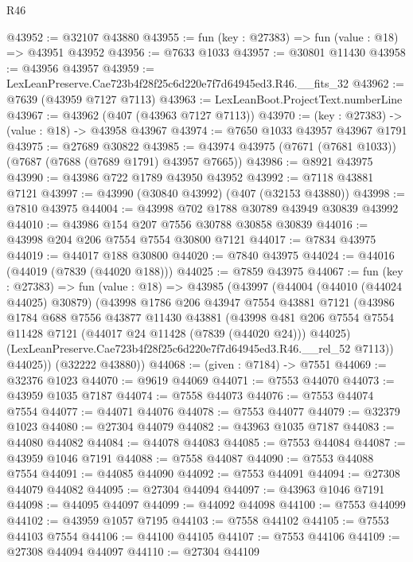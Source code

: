 \begin{lexlean}{R46}
\begin{coremodule}
@43952 := @32107 @43880
@43955 := fun (key : @27383) => fun (value : @18) => @43951 @43952
@43956 := @7633 @1033
@43957 := @30801 @11430
@43958 := @43956 @43957
@43959 := LexLeanPreserve.Cae723b4f28f25c6d220e7f7d64945ed3.R46.__fits_32
@43962 := @7639 (@43959 @7127 @7113)
@43963 := LexLeanBoot.ProjectText.numberLine
@43967 := @43962 (@407 (@43963 @7127 @7113))
@43970 := (key : @27383) -> (value : @18) -> @43958 @43967
@43974 := @7650 @1033 @43957 @43967 @1791
@43975 := @27689 @30822
@43985 := @43974 @43975 (@7671 (@7681 @1033)) (@7687 (@7688 (@7689 @1791) @43957 @7665))
@43986 := @8921 @43975
@43990 := @43986 @722 @1789 @43950 @43952
@43992 := @7118 @43881 @7121
@43997 := @43990 (@30840 @43992) (@407 (@32153 @43880))
@43998 := @7810 @43975
@44004 := @43998 @702 @1788 @30789 @43949 @30839 @43992
@44010 := @43986 @154 @207 @7556 @30788 @30858 @30839
@44016 := @43998 @204 @206 @7554 @7554 @30800 @7121
@44017 := @7834 @43975
@44019 := @44017 @188 @30800
@44020 := @7840 @43975
@44024 := @44016 (@44019 (@7839 (@44020 @188)))
@44025 := @7859 @43975
@44067 := fun (key : @27383) =>
  fun (value : @18) =>
  @43985
    (@43997
      (@44004
        (@44010 (@44024 @44025) @30879)
        (@43998
          @1786
          @206
          @43947
          @7554
          @43881
          @7121
          (@43986
            @1784
            @688
            @7556
            @43877
            @11430
            @43881
            (@43998
              @481
              @206
              @7554
              @7554
              @11428
              @7121
              (@44017 @24 @11428 (@7839 (@44020 @24)))
              @44025)
            (LexLeanPreserve.Cae723b4f28f25c6d220e7f7d64945ed3.R46.__rel_52 @7113))
          @44025))
      (@32222 @43880))
@44068 := (given : @7184) -> @7551
@44069 := @32376 @1023
@44070 := @9619 @44069
@44071 := @7553 @44070
@44073 := @43959 @1035 @7187
@44074 := @7558 @44073
@44076 := @7553 @44074 @7554
@44077 := @44071 @44076
@44078 := @7553 @44077
@44079 := @32379 @1023
@44080 := @27304 @44079
@44082 := @43963 @1035 @7187
@44083 := @44080 @44082
@44084 := @44078 @44083
@44085 := @7553 @44084
@44087 := @43959 @1046 @7191
@44088 := @7558 @44087
@44090 := @7553 @44088 @7554
@44091 := @44085 @44090
@44092 := @7553 @44091
@44094 := @27308 @44079 @44082
@44095 := @27304 @44094
@44097 := @43963 @1046 @7191
@44098 := @44095 @44097
@44099 := @44092 @44098
@44100 := @7553 @44099
@44102 := @43959 @1057 @7195
@44103 := @7558 @44102
@44105 := @7553 @44103 @7554
@44106 := @44100 @44105
@44107 := @7553 @44106
@44109 := @27308 @44094 @44097
@44110 := @27304 @44109

\end{coremodule}
\end{lexlean}
